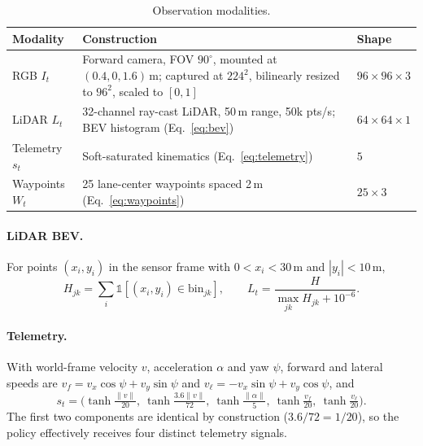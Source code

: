 \documentclass[11pt]{article}
\begin{document}
\begin{table}[!htbp]
  \centering
  \small
  \caption{Observation modalities.}
  \label{tab:obs}
  \begin{tabularx}{\linewidth}{@{}l X l@{}}
    \toprule
    Modality & Construction & Shape \\
    \midrule
    RGB $I_t$ & Forward camera, FOV $90^\circ$, mounted at $(0.4, 0, 1.6)$\,m; captured at $224^2$, bilinearly resized to $96^2$, scaled to $[0,1]$ & $96\times96\times3$ \\
    LiDAR $L_t$ & 32-channel ray-cast LiDAR, 50\,m range, 50k pts/s; BEV histogram (Eq.~\ref{eq:bev}) & $64\times64\times1$ \\
    Telemetry $s_t$ & Soft-saturated kinematics (Eq.~\ref{eq:telemetry}) & $5$ \\
    Waypoints $W_t$ & 25 lane-center waypoints spaced 2\,m (Eq.~\ref{eq:waypoints}) & $25\times3$ \\
    \bottomrule
  \end{tabularx}
\end{table}

\paragraph{LiDAR BEV.} For points $(x_i, y_i)$ in the sensor frame with $0 < x_i < 30$\,m and $|y_i| < 10$\,m,
\begin{equation}
H_{jk} = \sum_i \mathbb{1}\!\left[(x_i, y_i)\in \mathrm{bin}_{jk}\right], \qquad L_t = \frac{H}{\max_{jk} H_{jk} + 10^{-6}} .
\label{eq:bev}
\end{equation}

\paragraph{Telemetry.} With world-frame velocity $v$, acceleration $\alpha$ and yaw $\psi$, forward and lateral speeds are $v_f = v_x\cos\psi + v_y\sin\psi$ and $v_\ell = -v_x\sin\psi + v_y\cos\psi$, and
\begin{equation}
s_t = \Big(\tanh\tfrac{\lVert v\rVert}{20},\ \tanh\tfrac{3.6\lVert v\rVert}{72},\ \tanh\tfrac{\lVert \alpha\rVert}{5},\ \tanh\tfrac{v_f}{20},\ \tanh\tfrac{v_\ell}{20}\Big).
\label{eq:telemetry}
\end{equation}
The first two components are identical by construction ($3.6/72 = 1/20$), so the policy effectively receives four distinct telemetry signals.
\end{document}
